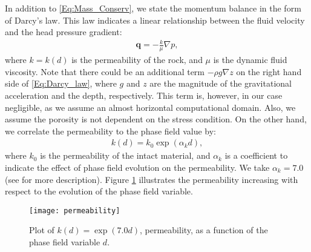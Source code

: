 In addition to \eqref{Eq:Mass_Conserv}, we state the momentum balance in the form of Darcy's law. This law indicates a linear relationship between the fluid velocity and the head pressure gradient:
\begin{equation}\label{Eq:Darcy_law}
    \begin{aligned}
        \bm{q} = -\frac{k}{\mu} \nabla p,
    \end{aligned}
\end{equation}
where $k=k(d)$ is the permeability of the rock, and $\mu$ is the dynamic fluid viscosity. %
Note that there could be an additional term $- \rho g\nabla z$ %
on the right hand side of \eqref{Eq:Darcy_law}, where $g$ and $z$ are the magnitude of the gravitational acceleration and the depth, respectively. This term is, however, in our case negligible, as we assume an almost horizontal computational domain.
Also, we assume the porosity is not dependent on the stress condition. On the other hand, we correlate the permeability to the phase field value by:
\begin{equation}\label{Eq:k_0}
    \begin{aligned}
        k(d) = k_0\exp{\left({\alpha}_k d\right)},
    \end{aligned}
\end{equation}
where $k_0$ is the permeability of the intact material, and ${\alpha}_k$ is a coefficient to indicate the effect of phase field evolution on the permeability. We take ${\alpha}_k=7.0$ (see \cite{PILLAI201836, ZHU2013179} for more description). Figure \ref{Fig:Permeability_increments} illustrates the permeability increasing with respect to the evolution of the phase field variable.


\begin{figure}[htbp]
    \centering
    \texttt{[image: permeability]}
    \caption{Plot of $k(d)=\exp(7.0 d)$, permeability, as a function of the phase field variable $d$.}
    \label{Fig:Permeability_increments}
\end{figure}

